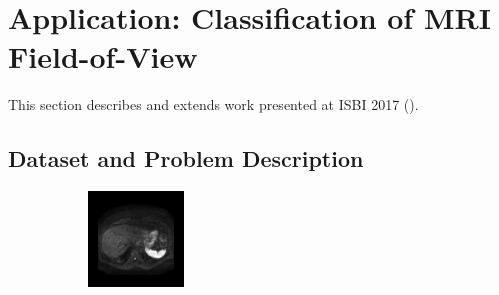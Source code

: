\section{Application: Classification of MRI Field-of-View}

This section describes and extends work presented at ISBI 2017 (\textcite{bertrand2017ISBI}).

\subsection{Dataset and Problem Description}

\begin{figure}[htb]
        \begin{subfigure}[b]{0.25\textwidth}
                \centering
                \includegraphics[width=.95\linewidth]{img_hyperopt/Abdomen_785}
        \end{subfigure}%
        \begin{subfigure}[b]{0.25\textwidth}
                \centering

\end{subfigure}
\end{figure}

